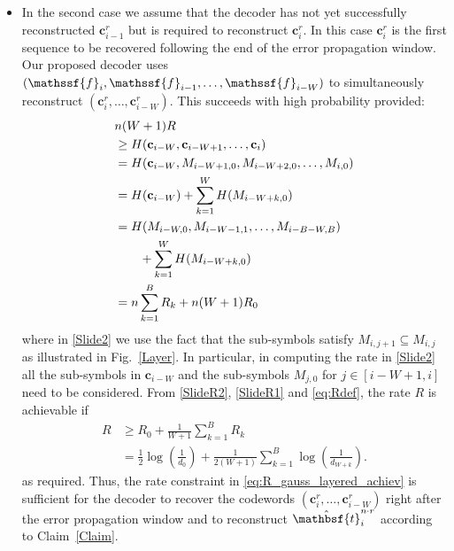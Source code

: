 \documentclass[journal, twocolumn, 10pt]{IEEEtran}
\newcommand{\bc}{{\mathbf{c}}}
\newcommand{\rvf}{{\mathssf{f}}}    %
\newcommand{\rvbt}{{\mathbsf{t}}}
\begin{document}
{{\begin{itemize}
\item In the second case we assume that the decoder has not yet successfully reconstructed $\bc_{i-1}^r$ but is required to reconstruct $\bc_i^r$. In this case $\bc_i^r$ is the first sequence to be recovered following the end of the error propagation window. Our proposed decoder uses $(\rvf_{i}, \rvf_{i-1},\ldots, \rvf_{i-W})$ to simultaneously reconstruct $( \bc_i^r,\ldots, \bc_{i-W}^r)$.
This succeeds with high probability provided:
\begin{align}
&n(W+1)R \notag\\
&\ge H(\bc_{i-W}, \bc_{i-W+1}, \ldots, \bc_{i})\notag\\
& = H(\bc_{i-W}, M_{i-W+1,0}, M_{i-W+2,0}, \ldots, M_{i,0})\label{Slide2}\\
& = H(\bc_{i-W}) + \sum_{k=1}^{W}H(M_{i-W+k,0})\label{Slide3}\\
&= H(M_{i-W,0},M_{i-W-1,1}, \ldots, M_{i-B-W, B}) \notag\\ &\qquad +\sum_{k=1}^{W}H(M_{i-W+k,0})\notag\\
& = n\sum_{k=1}^{B}R_{k} + n(W+1)R_{0} \label{SlideR1} 
\end{align}
%
where in \eqref{Slide2} we use the fact that 
the sub-symbols satisfy ${M}_{i,j+1} \subseteq {M}_{i,j}$ as illustrated in Fig.~\ref{Layer}.
In particular, in computing the rate in \eqref{Slide2} all the sub-symbols in $\bc_{i-W}$ and the sub-symbols $M_{j,0}$ for $j\in[i-W+1, i]$ need to be considered.
From \eqref{SlideR2}, \eqref{SlideR1} and \eqref{eq:Rdef}, the rate $R$ is achievable if
\begin{align}
R &\ge R_{0} + \frac{1}{W+1} \sum_{k=1}^{B} R_{k}\\
&=\frac{1}{2} \log\left( \frac{1}{d_0}\right) + \frac{1}{2(W+1)}\sum_{k=1}^{B} \log\left(\frac{1}{d_{W+k}}\right)\label{eq:R_gauss_layered_achiev}.
\end{align}
as required.
Thus, the rate constraint in \eqref{eq:R_gauss_layered_achiev} is sufficient for the decoder to recover the codewords $( \bc_i^r,\ldots, \bc_{i-W}^r)$ right after the error propagation window and to reconstruct $\hat{\rvbt}_{i}^{n\cdot r}$ according to Claim~\ref{Claim}.  
\end{itemize}
}

}
\end{document}
